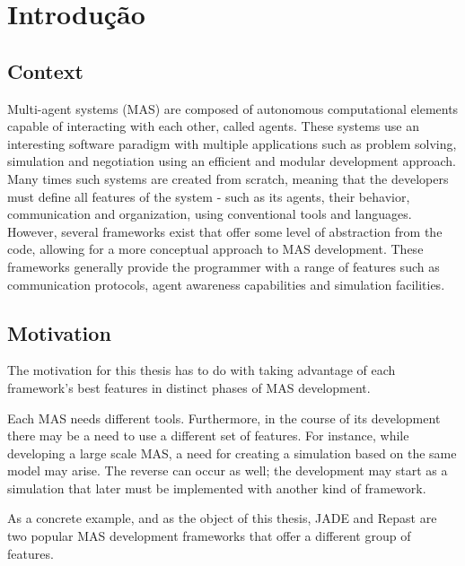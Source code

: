 \chapter{Introdução}
\label{chap:intro}

\section*{}


\section{Context}

Multi-agent systems (MAS) are composed of autonomous computational elements capable of interacting with each other, called agents. \cite{wooldridge2008introduction} These systems use an interesting software paradigm with multiple applications such as problem solving, simulation and negotiation using an efficient and modular development approach. \cite{ferber1999multi}
Many times such systems are created from scratch, meaning that the developers must define all features of the system - such as its agents, their behavior, communication and organization, using conventional tools and
languages. However, several frameworks exist that offer some level of abstraction from the code, allowing for a more conceptual approach to
MAS development. \cite{gormer2011jrep} These frameworks generally provide the programmer with a range of features such as communication protocols, agent awareness capabilities and simulation facilities.

\section{Motivation} \label{sec:goals}
The motivation for this thesis has to do with taking advantage of each
framework's best features in distinct phases of MAS development.

Each MAS needs different tools. Furthermore, in the course of its development
there may be a need to use a different set of features. For instance, while
developing a large scale MAS, a need for creating a simulation based on the
same model may arise. The reverse can occur as well; the development may start
as a simulation that later must be implemented with another kind of framework.

As a concrete example, and as the object of this thesis, JADE and Repast are
two popular MAS development frameworks that offer a different group of
features.

